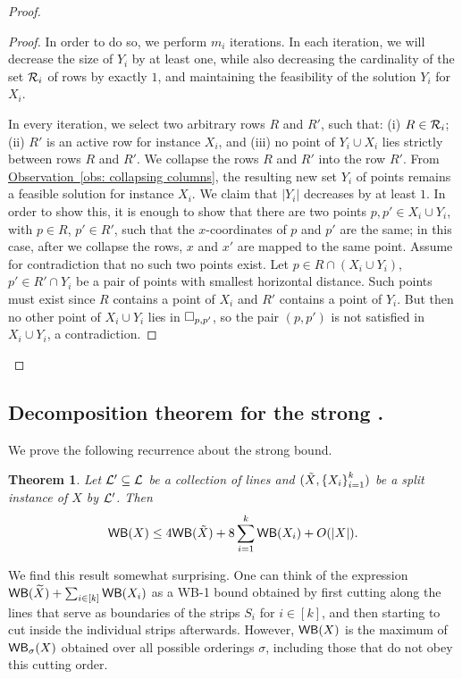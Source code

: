 \documentclass[11pt]{article}
\numberwithin{equation}{section}
\newtheorem{theorem}{Theorem}[section]
\theoremstyle{definition}
\theoremstyle{plain}
\newcommand{\expref}[2]{\hyperref[#2]{#1~\ref{#2}}}
\begin{document}
\begin{proof}
\begin{proof}
                In order to do so, we perform $m_i$ iterations. In each iteration, we will decrease the size of $Y_i$ by at least one, while also decreasing the cardinality of the set ${\mathcal R}_i$ of rows by exactly $1$, and maintaining the feasibility of the solution $Y_i$ for $X_i$.  
                
                In every iteration, we select two arbitrary rows $R$ and $R'$, such that: (i) $R\in {\mathcal R}_i$; (ii) $R'$ is an active row for instance $X_i$, and (iii) no point of $Y_i\cup X_i$ lies strictly between rows $R$ and $R'$. 
                We collapse the rows $R$ and $R'$ into the row $R'$. 
From \expref{Observation}{obs: collapsing columns}, the resulting new set $Y_i$ of points remains a feasible solution for instance $X_i$. 
We claim that $|Y_i|$ decreases by at least $1$. In order to show this, it is enough to show that there are two points $p,p'\in X_i\cup Y_i$, with $p\in R$, $p'\in R'$, such that the $x$-coordinates of $p$ and $p'$ are the same; in this case, after we collapse the rows, $x$ and $x'$ are mapped to the same point. Assume for contradiction that no such two points exist. Let $p\in R\cap (X_i\cup Y_i)$, $p'\in R'\cap Y_i$ be a pair of points with smallest horizontal distance. Such points must exist since $R$ contains a point of $X_i$ and $R'$ contains a point of $Y_i$. But then no other point of  $X_i\cup Y_i$ lies in $\Box_{p,p'}$, so the pair $(p,p')$ is not satisfied in $X_i\cup Y_i$, a contradiction.
%
%
%
%
%
\end{proof}
%
\end{proof}



%
%
%
%
\subsection{Decomposition theorem for the strong \WBone.}
\label{thm: wb}
%
%
We prove the following recurrence about the strong \WBone bound. 
%
%
%


\begin{theorem}\label{thm: WB for corner and strip instances}
%
%
        Let ${\mathcal L}' \subseteq {\mathcal L}$ be a collection of lines and $(\tilde{X}, \left\{ X_i \right\}_{i=1}^k)$ be a split instance of $X$ by ${\mathcal L}'$. Then 
	$$\mathsf{WB}(X)\leq 4\mathsf{WB}(\tilde{X})+8\sum_{i=1}^k\mathsf{WB}(X_i)+O(|X|).   $$
\end{theorem}


We find this result somewhat surprising. 
One can think of the expression $\mathsf{WB}(\widetilde{X})+\sum_{i \in [k]}\mathsf{WB}(X_i)$ as a WB-1 bound obtained by first cutting along the lines that serve as boundaries of the strips $S_i$ for $i \in [k]$, and then starting to cut inside the individual strips afterwards. However, $\mathsf{WB}(X)$ is the maximum of $\mathsf{WB}_{\sigma}(X)$ obtained over all possible orderings $\sigma$, including those that do not obey this cutting order. %
%
\end{document}
